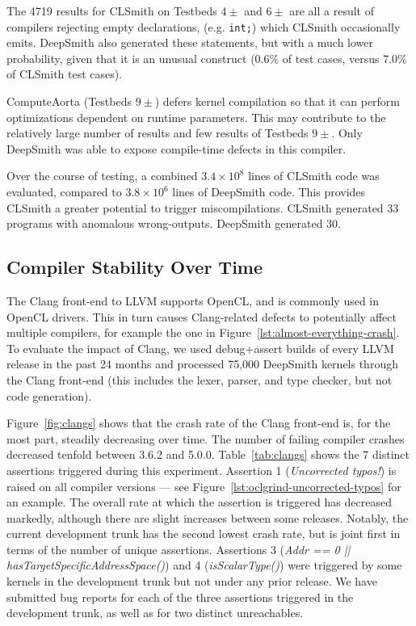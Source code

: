 The 4719 \abf results for CLSmith on Testbeds $4\pm$ and $6\pm$ are all a result
of compilers rejecting empty declarations, (e.g. \texttt{int;}) which CLSmith
occasionally emits. DeepSmith also generated these statements, but with a much
lower probability, given that it is an unusual construct (0.6\% of test cases,
versus 7.0\% of CLSmith test cases).

ComputeAorta (Testbeds $9\pm$) defers kernel compilation so that it can perform
optimizations dependent on runtime parameters. This may contribute to the
relatively large number of \arc results and few \bc results of Testbeds $9\pm$.
Only DeepSmith was able to expose compile-time defects in this compiler.

Over the course of testing, a combined $3.4 \times 10^8$ lines of CLSmith code
was evaluated, compared to $3.8 \times 10^6$ lines of DeepSmith code. This
provides CLSmith a greater potential to trigger miscompilations. CLSmith
generated 33 programs with anomalous wrong-outputs. DeepSmith generated 30.


\subsection{Compiler Stability Over Time}%
\label{subsec:clangs}

The Clang front-end to LLVM supports OpenCL, and is commonly used in OpenCL
drivers. This in turn causes Clang-related defects to potentially affect
multiple compilers, for example the one in
Figure~\ref{lst:almost-everything-crash}. To evaluate the impact of Clang, we
used debug+assert builds of every LLVM release in the past 24 months and
processed 75,000 DeepSmith kernels through the Clang front-end (this includes
the lexer, parser, and type checker, but not code generation).

Figure~\ref{fig:clangs} shows that the crash rate of the Clang front-end is, for
the most part, steadily decreasing over time. The number of failing compiler
crashes decreased tenfold between 3.6.2 and 5.0.0. Table~\ref{tab:clangs} shows
the 7 distinct assertions triggered during this experiment. Assertion 1
(\emph{Uncorrected typos!}) is raised on all compiler versions --- see
Figure~\ref{lst:oclgrind-uncorrected-typos} for an example. The overall rate at
which the assertion is triggered has decreased markedly, although there are
slight increases between some releases. Notably, the current development trunk
has the second lowest crash rate, but is joint first in terms of the number of
unique assertions. Assertions 3 (\emph{Addr == 0 ||
hasTargetSpecificAddressSpace()}) and 4 (\emph{isScalarType()}) were triggered
by some kernels in the development trunk but not under any prior release. We
have submitted bug reports for each of the three assertions triggered in the
development trunk, as well as for two distinct unreachables.

